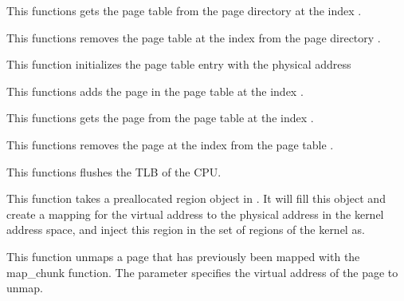 {
  This functions gets the page table  from the page directory
   at the index .
}

{
  This functions removes the page table at the index  from the
  page directory .
}

{
  This function initializes the page table entry  with the
  physical address 
}

{
  This functions adds the page  in the page table
   at the index .
}

{
  This functions gets the page  from the page table
   at the index .
}

{
  This functions removes the page at the index  from the
  page table .
}

{
  This functions flushes the TLB of the CPU.
}

{
  This function takes a preallocated region object in .
  It will fill this object and create a mapping for the virtual address
   to the physical address  in the kernel address
  space, and inject this region in the set of regions of the kernel as.
}

{
  This function unmaps a page that has previously been mapped with the
  map\_chunk function. The parameter  specifies the virtual
  address of the page to unmap.
}

